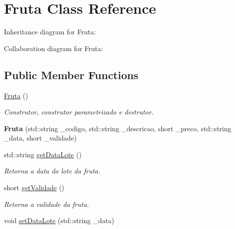\hypertarget{classFruta}{}\section{Fruta Class Reference}
\label{classFruta}


Inheritance diagram for Fruta\+:


Collaboration diagram for Fruta\+:
\subsection*{Public Member Functions}
\begin{DoxyCompactItemize}
\item 
\hyperlink{classFruta_ae1b52e5f60e121e940e9523e71b38e2d}{Fruta} ()\hypertarget{classFruta_ae1b52e5f60e121e940e9523e71b38e2d}{}\label{classFruta_ae1b52e5f60e121e940e9523e71b38e2d}

\begin{DoxyCompactList}\small\item\em Construtor, construtor parametrizado e destrutor. \end{DoxyCompactList}\item 
{\bfseries Fruta} (std\+::string \+\_\+codigo, std\+::string \+\_\+descricao, short \+\_\+preco, std\+::string \+\_\+data, short \+\_\+validade)\hypertarget{classFruta_ac36ec9f5c6b6ed5d7ad0ff1726520106}{}\label{classFruta_ac36ec9f5c6b6ed5d7ad0ff1726520106}

\item 
std\+::string \hyperlink{classFruta_a89525ef74d892639b1a56dbf1c6ffe61}{get\+Data\+Lote} ()\hypertarget{classFruta_a89525ef74d892639b1a56dbf1c6ffe61}{}\label{classFruta_a89525ef74d892639b1a56dbf1c6ffe61}

\begin{DoxyCompactList}\small\item\em Retorna a data do lote da fruta. \end{DoxyCompactList}\item 
short \hyperlink{classFruta_ab12db1faf3d5a0743ab461bc3315832e}{get\+Validade} ()\hypertarget{classFruta_ab12db1faf3d5a0743ab461bc3315832e}{}\label{classFruta_ab12db1faf3d5a0743ab461bc3315832e}

\begin{DoxyCompactList}\small\item\em Retorna a validade da fruta. \end{DoxyCompactList}\item 
void \hyperlink{classFruta_aa6cc01d8af01018e0a90b91e91884c13}{set\+Data\+Lote} (std\+::string \+\_\+data)\hypertarget{classFruta_aa6cc01d8af01018e0a90b91e91884c13}{}\label{classFruta_aa6cc01d8af01018e0a90b91e91884c13}


\end{DoxyCompactItemize}
